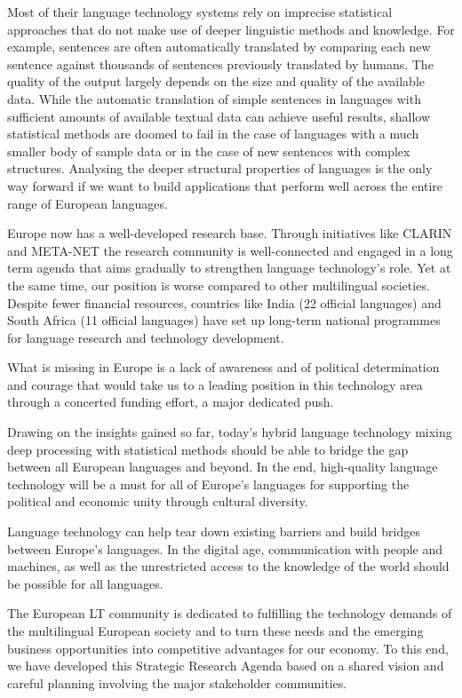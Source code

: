 \documentclass[10pt, plain]{../../metanetpaper}
\begin{document}
\begin{multicols}{2}
Most of their language technology systems rely on imprecise statistical approaches that do not make use of deeper linguistic methods and knowledge. For example, sentences are often automatically translated by comparing each new sentence against thousands of sentences previously translated by humans. The quality of the output largely depends on the size and quality of the available data. While the automatic translation of simple sentences in languages with sufficient amounts of available textual data can achieve useful results, shallow statistical methods are doomed to fail in the case of languages with a much smaller body of sample data or in the case of new sentences with complex structures. Analysing the deeper structural properties of languages is the only way forward if we want to build applications that perform well across the entire range of European languages.

Europe now has a well-developed research base. Through initiatives like CLARIN and META-NET the research community is well-connected and engaged in a long term agenda that aims gradually to strengthen language technology's role. Yet at the same time, our position is worse compared to other multilingual societies. Despite fewer financial resources, countries like India (22 official languages) and South Africa (11 official languages) have set up long-term national programmes for language research and technology development.

What is missing in Europe is a lack of awareness and of political determination and courage that would take us to a leading position in this technology area through a concerted funding effort, a major dedicated push.

Drawing on the insights gained so far, today’s hybrid language technology mixing deep processing with statistical methods should be able to bridge the gap between all European languages and beyond. In the end, high-quality language technology will be a must for all of Europe's languages for supporting the political and economic unity through cultural diversity.

Language technology can help tear down existing barriers and build bridges between Europe’s languages. In the digital age, communication with people and machines, as well as the unrestricted access to the knowledge of the world should be possible for all languages.


The European LT community is dedicated to fulfilling the technology demands of the multilingual European society and to turn these needs and the emerging business opportunities into competitive advantages for our economy. To this end, we have developed this Strategic Research Agenda based on a shared vision and careful planning involving the major stakeholder communities.


\end{multicols}
\end{document}
